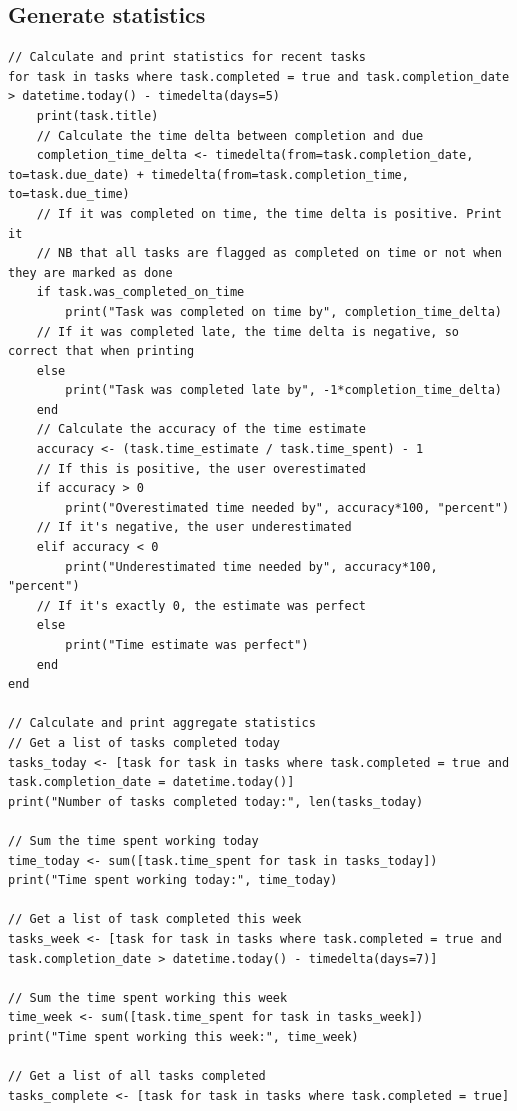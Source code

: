 \documentclass{article}
\begin{document}
\subsection{Generate statistics}
\begin{lstlisting}[breaklines]
// Calculate and print statistics for recent tasks
for task in tasks where task.completed = true and task.completion_date > datetime.today() - timedelta(days=5)
    print(task.title)
    // Calculate the time delta between completion and due
    completion_time_delta <- timedelta(from=task.completion_date, to=task.due_date) + timedelta(from=task.completion_time, to=task.due_time)
    // If it was completed on time, the time delta is positive. Print it
    // NB that all tasks are flagged as completed on time or not when they are marked as done
    if task.was_completed_on_time
        print("Task was completed on time by", completion_time_delta)
    // If it was completed late, the time delta is negative, so correct that when printing
    else
        print("Task was completed late by", -1*completion_time_delta)
    end
    // Calculate the accuracy of the time estimate
    accuracy <- (task.time_estimate / task.time_spent) - 1
    // If this is positive, the user overestimated
    if accuracy > 0
        print("Overestimated time needed by", accuracy*100, "percent")
    // If it's negative, the user underestimated
    elif accuracy < 0
        print("Underestimated time needed by", accuracy*100, "percent")
    // If it's exactly 0, the estimate was perfect
    else
        print("Time estimate was perfect")
    end
end

// Calculate and print aggregate statistics
// Get a list of tasks completed today
tasks_today <- [task for task in tasks where task.completed = true and task.completion_date = datetime.today()]
print("Number of tasks completed today:", len(tasks_today)

// Sum the time spent working today
time_today <- sum([task.time_spent for task in tasks_today])
print("Time spent working today:", time_today)

// Get a list of task completed this week
tasks_week <- [task for task in tasks where task.completed = true and task.completion_date > datetime.today() - timedelta(days=7)]

// Sum the time spent working this week
time_week <- sum([task.time_spent for task in tasks_week])
print("Time spent working this week:", time_week)

// Get a list of all tasks completed
tasks_complete <- [task for task in tasks where task.completed = true]


\end{lstlisting}
\end{document}
